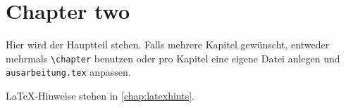 
\chapter{Chapter two}
\label{chap:ch2}

Hier wird der Hauptteil stehen. Falls mehrere Kapitel gewünscht, entweder mehrmals \texttt{\textbackslash{}chapter} benutzen oder pro Kapitel eine eigene Datei anlegen und \texttt{ausarbeitung.tex} anpassen.

LaTeX-Hinweise stehen in \cref{chap:latexhints}.

